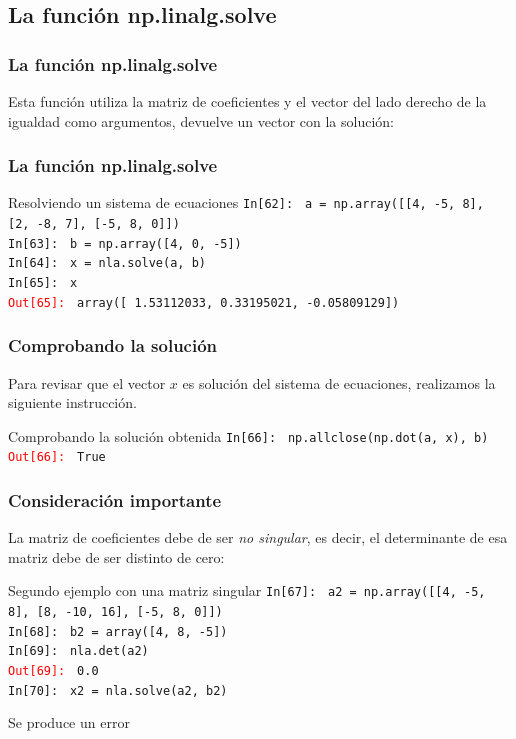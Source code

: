 \subsection{La función np.linalg.solve}
\begin{frame}
\frametitle{La función np.linalg.solve}
Esta función utiliza la matriz de coeficientes y el vector del lado derecho de la igualdad como argumentos, devuelve un vector con la solución:
\end{frame}
\begin{frame}[fragile]
\frametitle{La función np.linalg.solve}
\fontsize{12}{12}\selectfont
\begin{exampleblock}{Resolviendo un sistema de ecuaciones}
\textcolor{ao}{\texttt{In[62]: }} \texttt{a = np.array([[4, -5, 8], [2, -8, 7], [-5, 8, 0]])} \\
\medskip
\pause
\textcolor{ao}{\texttt{In[63]: }} \texttt{b = np.array([4, 0, -5])} \\
\medskip
\pause
\textcolor{ao}{\texttt{In[64]: }} \texttt{x = nla.solve(a, b)} \\
\medskip
\pause
\textcolor{ao}{\texttt{In[65]: }} \texttt{x} \\
\medskip
\pause
\textcolor{red}{\texttt{Out[65]: }} \texttt{array([ 1.53112033,  0.33195021, -0.05809129])}
\end{exampleblock}
\end{frame}
\begin{frame}[fragile]
\frametitle{Comprobando la solución}
Para revisar que el vector $x$ es solución del sistema de ecuaciones, realizamos la siguiente instrucción.
\begin{exampleblock}{Comprobando la solución obtenida}
\textcolor{ao}{\texttt{In[66]: }} \texttt{np.allclose(np.dot(a, x), b)} \\
\medskip
\pause
\textcolor{red}{\texttt{Out[66]: }} \texttt{True}
\end{exampleblock}
\end{frame}
\begin{frame}
\frametitle{Consideración importante}
La matriz de coeficientes debe de ser \emph{no singular}, es decir, el determinante de esa matriz debe de ser distinto de cero:
\fontsize{12}{12}\selectfont
\begin{exampleblock}{Segundo ejemplo con una matriz singular}
\textcolor{ao}{\texttt{In[67]: }} \texttt{a2 = np.array([[4, -5, 8], [8, -10, 16], [-5, 8, 0]])} \\
\medskip
\pause
\textcolor{ao}{\texttt{In[68]: }} \texttt{b2 = array([4, 8, -5])} \\
\medskip
\pause  
\textcolor{ao}{\texttt{In[69]: }} \texttt{nla.det(a2)} \\
\medskip
\pause
\textcolor{red}{\texttt{Out[69]: }} \texttt{0.0} \\
\medskip
\pause
\textcolor{ao}{\texttt{In[70]: }} \texttt{x2 = nla.solve(a2, b2)} \\
\end{exampleblock}
\pause
Se produce un error
\end{frame}
